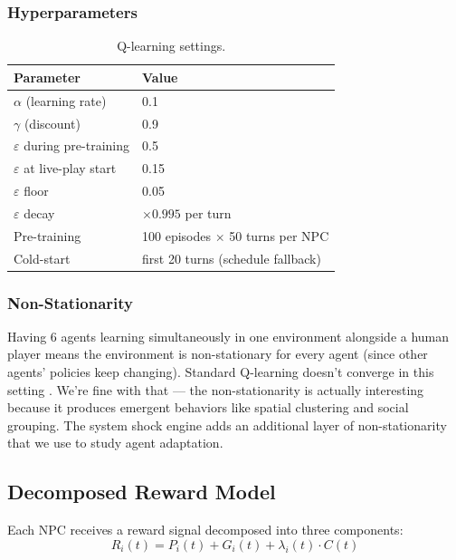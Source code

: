 \subsubsection{Hyperparameters}

\begin{table}[ht]
\centering
\caption{Q-learning settings.}
\label{tab:qparams}
\begin{tabular}{@{}ll@{}}
\toprule
Parameter & Value \\
\midrule
$\alpha$ (learning rate) & 0.1 \\
$\gamma$ (discount) & 0.9 \\
$\varepsilon$ during pre-training & 0.5 \\
$\varepsilon$ at live-play start & 0.15 \\
$\varepsilon$ floor & 0.05 \\
$\varepsilon$ decay & $\times 0.995$ per turn \\
Pre-training & 100 episodes $\times$ 50 turns per NPC \\
Cold-start & first 20 turns (schedule fallback) \\
\bottomrule
\end{tabular}
\end{table}

\subsubsection{Non-Stationarity}

Having 6 agents learning simultaneously in one environment alongside a human player means the environment is non-stationary for every agent (since other agents' policies keep changing). Standard Q-learning doesn't converge in this setting \cite{bowling2002multiagent}. We're fine with that --- the non-stationarity is actually interesting because it produces emergent behaviors like spatial clustering and social grouping. The system shock engine adds an additional layer of non-stationarity that we use to study agent adaptation.

\subsection{Decomposed Reward Model}

Each NPC receives a reward signal decomposed into three components:
$$R_i(t) = P_i(t) + G_i(t) + \lambda_i(t) \cdot C(t)$$

